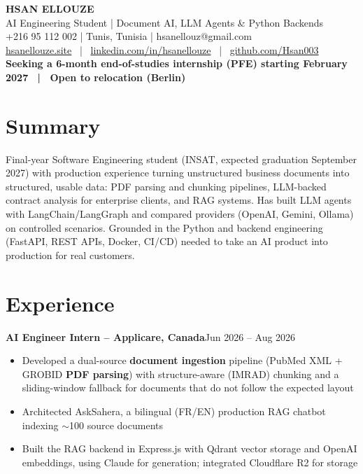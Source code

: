 \documentclass[10pt,a4paper]{article}
\newcommand{\entry}[2]{\vspace{1pt}\noindent\textbf{#1}\hfill{\color{muted}#2}\par}
\begin{document}
\begin{center}
  {\LARGE\bfseries HSAN ELLOUZE}\\[2pt]
  {\color{muted} AI Engineering Student | Document AI, LLM Agents \& Python Backends}\\[2pt]
  {\footnotesize +216 95 112 002 | Tunis, Tunisia | hsanellouz@gmail.com}\\[1pt]
  {\footnotesize \href{https://hsanellouze.site}{hsanellouze.site} \ | \ \href{https://linkedin.com/in/hsanellouze}{linkedin.com/in/hsanellouze} \ | \ \href{https://github.com/Hsan003}{github.com/Hsan003}}\\[3pt]
  {\footnotesize\bfseries Seeking a 6-month end-of-studies internship (PFE) starting February 2027 \ | \ Open to relocation (Berlin)}
\end{center}

\section{Summary}
Final-year Software Engineering student (INSAT, expected graduation September 2027) with production experience turning unstructured business documents into structured, usable data: PDF parsing and chunking pipelines, LLM-backed contract analysis for enterprise clients, and RAG systems. Has built LLM agents with LangChain/LangGraph and compared providers (OpenAI, Gemini, Ollama) on controlled scenarios. Grounded in the Python and backend engineering (FastAPI, REST APIs, Docker, CI/CD) needed to take an AI product into production for real customers.

\section{Experience}
\entry{AI Engineer Intern -- Applicare, Canada}{Jun 2026 -- Aug 2026}
\begin{itemize}
  \item Developed a dual-source \textbf{document ingestion} pipeline (PubMed XML + GROBID \textbf{PDF parsing}) with structure-aware (IMRAD) chunking and a sliding-window fallback for documents that do not follow the expected layout
  \item Architected AskSahera, a bilingual (FR/EN) production RAG chatbot indexing $\sim$100 source documents
  \item Built the RAG backend in Express.js with Qdrant vector storage and OpenAI embeddings, using Claude for generation; integrated Cloudflare R2 for storage
\end{itemize}
\end{document}

